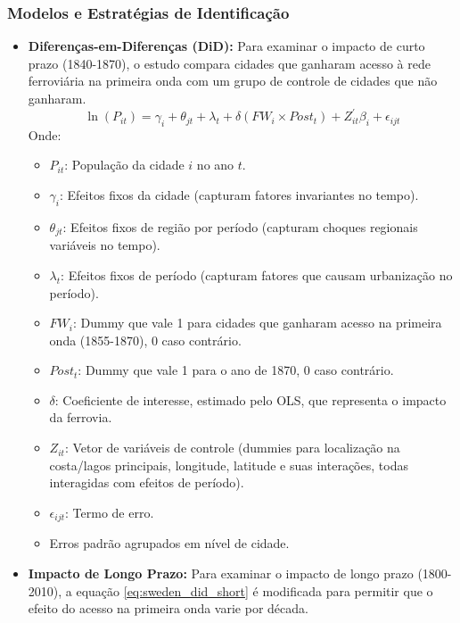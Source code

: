 \documentclass[12pt]{article}
\begin{document}
\subsubsection*{Modelos e Estratégias de Identificação}
\begin{itemize}
    \item \textbf{Diferenças-em-Diferenças (DiD):} Para examinar o impacto de curto prazo (1840-1870), o estudo compara cidades que ganharam acesso à rede ferroviária na primeira onda com um grupo de controle de cidades que não ganharam.
    \begin{equation} \label{eq:sweden_did_short}
        \ln(P_{it}) = \gamma_i + \theta_{jt} + \lambda_t + \delta(FW_i \times Post_t) + Z_{it}^{\prime}\beta_i + \epsilon_{ijt}
    \end{equation}
    Onde:
    \begin{itemize}
        \item $P_{it}$: População da cidade $i$ no ano $t$.
        \item $\gamma_i$: Efeitos fixos da cidade (capturam fatores invariantes no tempo).
        \item $\theta_{jt}$: Efeitos fixos de região por período (capturam choques regionais variáveis no tempo).
        \item $\lambda_t$: Efeitos fixos de período (capturam fatores que causam urbanização no período).
        \item $FW_i$: Dummy que vale 1 para cidades que ganharam acesso na primeira onda (1855-1870), 0 caso contrário.
        \item $Post_t$: Dummy que vale 1 para o ano de 1870, 0 caso contrário.
        \item $\delta$: Coeficiente de interesse, estimado pelo OLS, que representa o impacto da ferrovia.
        \item $Z_{it}$: Vetor de variáveis de controle (dummies para localização na costa/lagos principais, longitude, latitude e suas interações, todas interagidas com efeitos de período).
        \item $\epsilon_{ijt}$: Termo de erro.
        \item Erros padrão agrupados em nível de cidade.
    \end{itemize}
    \item \textbf{Impacto de Longo Prazo:} Para examinar o impacto de longo prazo (1800-2010), a equação \eqref{eq:sweden_did_short} é modificada para permitir que o efeito do acesso na primeira onda varie por década.
    \begin{equation} \label{eq:sweden_did_long}

\end{equation}
\end{itemize}
\end{document}
